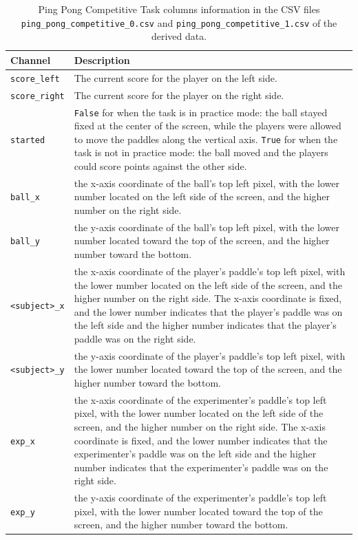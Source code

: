 \begin{table}[h]
\centering
\begin{tabularx}{\textwidth}{lX}
\toprule
Channel & Description \\
\midrule
\texttt{score\_left} & The current score for the player on the left side.\\
\texttt{score\_right} & The current score for the player on the right side.\\
\texttt{started} & \texttt{False} for when the task is in practice mode: the ball stayed fixed at the center of the screen, while the players were allowed to move the paddles along the vertical axis. \texttt{True} for when the task is not in practice mode: the ball moved and the players could score points against the other side.\\
\texttt{ball\_x} & the x-axis coordinate of the ball's top left pixel, with the lower number located on the left side of the screen, and the higher number on the right side.\\
\texttt{ball\_y} & the y-axis coordinate of the ball's top left pixel, with the lower number located toward the top  of the screen, and the higher number toward the bottom.\\
\texttt{<subject>\_x} & the x-axis coordinate of the player's paddle's top left pixel, with the lower number located on the left side of the screen, and the higher number on the right side. The x-axis coordinate is fixed, and the lower number indicates that the player's paddle was on the left side and the higher number indicates that the player's paddle was on the right side.\\
\texttt{<subject>\_y} & the y-axis coordinate of the player's paddle's top left pixel, with the lower number located toward the top of the screen, and the higher number toward the bottom.\\
\texttt{exp\_x} & the x-axis coordinate of the experimenter's paddle's top left pixel, with the lower number located on the left side of the screen, and the higher number on the right side. The x-axis coordinate is fixed, and the lower number indicates that the experimenter's paddle was on the left side and the higher number indicates that the experimenter's paddle was on the right side.\\
\texttt{exp\_y} & the y-axis coordinate of the experimenter's paddle's top left pixel, with the lower number located toward the top of the screen, and the higher number toward the bottom.\\
\bottomrule
\end{tabularx}
\caption{Ping Pong Competitive Task columns information in the CSV files \texttt{ping\_pong\_competitive\_0.csv} and \texttt{ping\_pong\_competitive\_1.csv} of the derived data.}
\label{tab:ping_pong_competitive_task_columns}
\end{table}

